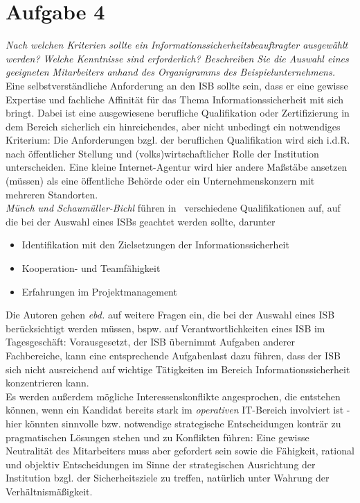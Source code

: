 \chapter{Aufgabe 4}

\textit{Nach welchen Kriterien sollte ein Informationssicherheitsbeauftragter ausgewählt
werden? Welche Kenntnisse sind erforderlich? Beschreiben Sie die Auswahl eines
geeigneten Mitarbeiters anhand des Organigramms des Beispielunternehmens.}\\

\noindent
Eine selbstverständliche Anforderung an den ISB sollte sein, dass er eine gewisse Expertise und fachliche Affinität für das Thema Informationssicherheit mit sich bringt.
Dabei ist eine ausgewiesene berufliche Qualifikation oder Zertifizierung in dem Bereich sicherlich ein hinreichendes, aber nicht unbedingt ein notwendiges Kriterium: Die Anforderungen {bzgl.} der beruflichen Qualifikation wird sich i.d.R. nach öffentlicher Stellung und (volks)wirtschaftlicher Rolle der Institution unterscheiden.
Eine kleine Internet-Agentur wird hier andere Maßstäbe ansetzen (müssen) als eine öffentliche Behörde oder ein Unternehmenskonzern mit mehreren Standorten.\\

\noindent
\textit{Münch und Schaumüller-Bichl} führen in~\cite[43]{ITS2} verschiedene Qualifikationen auf, auf die bei der Auswahl eines ISBs geachtet werden sollte, darunter

\begin{itemize}
    \itemsep0.5em
    \item Identifikation mit den Zielsetzungen der Informationssicherheit
    \item Kooperation- und Teamfähigkeit
    \item Erfahrungen im Projektmanagement
\end{itemize}

Die Autoren gehen \textit{ebd.} auf weitere Fragen ein, die bei der Auswahl eines ISB berücksichtigt werden müssen, bspw. auf  Verantwortlichkeiten eines ISB im Tagesgeschäft: Vorausgesetzt, der ISB übernimmt Aufgaben anderer Fachbereiche, kann eine entsprechende Aufgabenlast dazu führen, dass der ISB sich nicht ausreichend auf wichtige Tätigkeiten im Bereich Informationssicherheit konzentrieren kann.\\
Es werden außerdem mögliche Interessenskonflikte angesprochen, die entstehen können, wenn ein Kandidat bereits stark im \textit{operativen} IT-Bereich involviert ist - hier könnten sinnvolle bzw. notwendige strategische Entscheidungen konträr zu pragmatischen Lösungen stehen und zu Konflikten führen: Eine gewisse Neutralität des Mitarbeiters muss aber gefordert sein sowie die Fähigkeit, rational und objektiv Entscheidungen im Sinne der strategischen Ausrichtung der Institution bzgl. der Sicherheitsziele zu treffen, natürlich unter Wahrung der Verhältnismäßigkeit.\\

